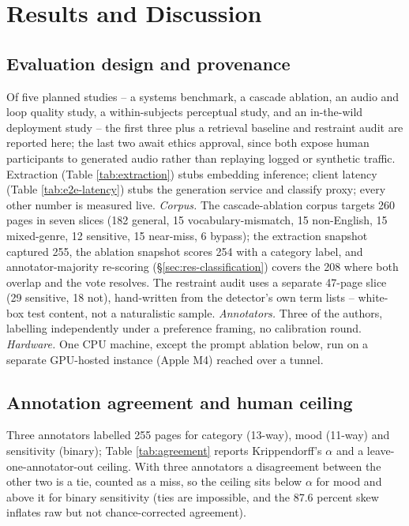 \documentclass[conference]{IEEEtran}
\begin{document}
\section{Results and Discussion}
\label{sec:results}

\subsection{Evaluation design and provenance}
\label{sec:res-design}

Of five planned studies -- a systems benchmark, a cascade ablation, an
audio and loop quality study, a within-subjects perceptual study, and an
in-the-wild deployment study -- the first three plus a retrieval baseline
and restraint audit are reported here; the last two await ethics
approval, since both expose human participants to generated audio rather
than replaying logged or synthetic traffic. Extraction (Table
\ref{tab:extraction}) stubs embedding inference; client latency (Table
\ref{tab:e2e-latency}) stubs the generation service and classify proxy;
every other number is measured live. \emph{Corpus.} The cascade-ablation
corpus targets 260 pages in seven slices (182 general, 15
vocabulary-mismatch, 15 non-English, 15 mixed-genre, 12 sensitive, 15
near-miss, 6 bypass); the extraction snapshot captured 255, the ablation
snapshot scores 254 with a category label, and annotator-majority
re-scoring (\S\ref{sec:res-classification}) covers the 208 where both
overlap and the vote resolves. The restraint audit uses a separate
47-page slice (29 sensitive, 18 not), hand-written from the detector's
own term lists -- white-box test content, not a naturalistic sample.
\emph{Annotators.} Three of the authors, labelling independently under a
preference framing, no calibration round. \emph{Hardware.} One CPU
machine, except the prompt ablation below, run on a separate GPU-hosted
instance (Apple M4) reached over a tunnel.

\subsection{Annotation agreement and human ceiling}
\label{sec:res-agreement}

Three annotators labelled 255 pages for category (13-way), mood (11-way)
and sensitivity (binary); Table
\ref{tab:agreement} reports Krippendorff's $\alpha$ and a
leave-one-annotator-out ceiling. With three annotators a disagreement
between the other two is a tie, counted as a miss, so the ceiling sits
below $\alpha$ for mood and above it for binary sensitivity (ties are
impossible, and the 87.6 percent skew inflates raw but not
chance-corrected agreement).
\end{document}
